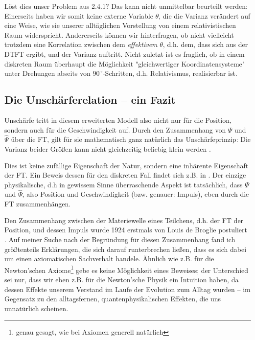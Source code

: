 \documentclass[a4paper,12pt,ngerman]{scrartcl}
\theoremstyle{plain}
\theoremstyle{plain}
\theoremstyle{plain}
\theoremstyle{plain}
\begin{document}
Löst dies unser Problem aus 2.4.1? Das kann nicht unmittelbar beurteilt werden: Einerseits haben wir somit keine externe Variable $\theta$, die die Varianz verändert auf eine Weise, wie sie unserer alltäglichen Vorstellung von einem relativistischen Raum widerspricht. Andererseits können wir hinterfragen, ob nicht vielleicht trotzdem eine Korrelation zwischen dem \textit{effektivem} $\theta$, d.h. dem, dass sich aus der DTFT ergibt, und der Varianz auftritt. Nicht zuletzt ist es fraglich, ob in einem diskreten Raum überhaupt die Möglichkeit "gleichwertiger Koordinatensysteme" unter Drehungen abseits von $90^{\,\circ}$-Schritten, d.h. Relativismus, realisierbar ist. 

\subsection{Die Unschärferelation -- ein Fazit}

Unschärfe tritt in diesem erweiterten Modell also nicht nur für die Position, sondern auch für die Geschwindigkeit auf. Durch den Zusammenhang von $\Psi$ und $\widehat{\Psi}$ über die FT, gilt für sie mathematisch ganz natürlich das Unschärfeprinzip: Die Varianz beider Größen kann nicht gleichzeitig beliebig klein werden \cite{uncertainty}. 

Dies ist keine zufällige Eigenschaft der Natur, sondern eine inhärente Eigenschaft der FT. Ein Beweis dessen für den diskreten Fall findet sich z.B. in \cite{uncertainty}. Der einzige physikalische, d.h in gewissem Sinne überraschende Aspekt ist tatsächlich, dass $\Psi$ und $\widehat{\Psi}$, also Position und Geschwindigkeit (bzw. genauer: Impuls), eben durch die FT zusammenhängen.

Den Zusammenhang zwischen der Materiewelle eines Teilchens, d.h. der FT der Position, und dessen Impuls wurde 1924 erstmals von Louis de Broglie postuliert \cite{broglie}. Auf meiner Suche nach der Begründung für diesen Zusammenhang fand ich größtenteils Erklärungen, die sich darauf runterbrechen ließen, dass es sich dabei um einen axiomatischen Sachverhalt handele. Ähnlich wie z.B. für die Newton'schen Axiome\footnote{genau gesagt, wie bei Axiomen generell natürlich} gebe es keine Möglichkeit eines Beweises; der Unterschied sei nur, dass wir eben z.B. für die Newton'sche Physik ein Intuition haben, da dessen Effekte unserem Verstand im Laufe der Evolution zum Alltag wurden -- im Gegensatz zu den alltagsfernen, quantenphysikalischen Effekten, die uns unnatürlich scheinen.
\end{document}
